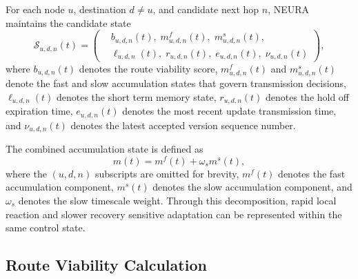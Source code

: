 \documentclass[5p,times]{elsarticle}
\begin{document}
For each node $u$, destination $d \neq u$, and candidate next hop $n$, NEURA maintains the candidate state
\begin{equation}
\mathcal{S}_{u,d,n}(t) =
\left(
\begin{aligned}
&b_{u,d,n}(t),\; m^f_{u,d,n}(t),\; m^s_{u,d,n}(t),\\
&\ell_{u,d,n}(t),\; r_{u,d,n}(t),\; e_{u,d,n}(t),\; \nu_{u,d,n}(t)
\end{aligned}
\right),
\end{equation}
where $b_{u,d,n}(t)$ denotes the route viability score, $m^f_{u,d,n}(t)$ and $m^s_{u,d,n}(t)$ denote the fast and slow accumulation states that govern transmission decisions, $\ell_{u,d,n}(t)$ denotes the short term memory state, $r_{u,d,n}(t)$ denotes the hold off expiration time, $e_{u,d,n}(t)$ denotes the most recent update transmission time, and $\nu_{u,d,n}(t)$ denotes the latest accepted version sequence number.

The combined accumulation state is defined as
\begin{equation}
m(t) = m^{f}(t) + \omega_s m^{s}(t),
\end{equation}
where the $(u,d,n)$ subscripts are omitted for brevity, $m^{f}(t)$ denotes the fast accumulation component, $m^{s}(t)$ denotes the slow accumulation component, and $\omega_s$ denotes the slow timescale weight. Through this decomposition, rapid local reaction and slower recovery sensitive adaptation can be represented within the same control state.

\subsection{Route Viability Calculation}
\end{document}
